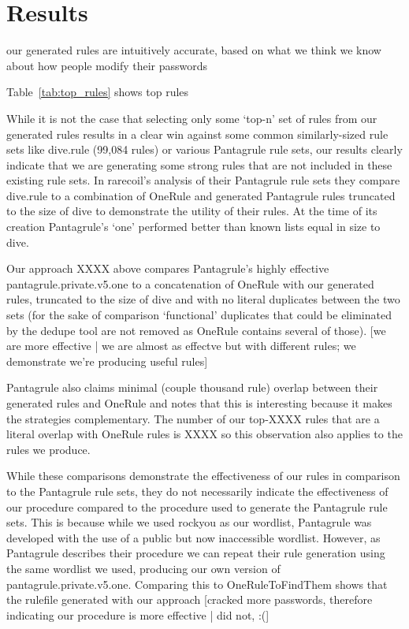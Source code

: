 \documentclass[letterpaper,twocolumn,10pt]{article}
\begin{document}
\section{Results}

our generated rules are intuitively accurate, based on what we think we know
about how people modify their passwords

Table~\ref{tab:top_rules} shows top rules

While it is not the case that selecting only some `top-n' set of rules from our
generated rules results in a clear win against some common similarly-sized rule sets
like dive.rule (99,084 rules) or various Pantagrule rule sets, our results clearly
indicate that we are generating some strong rules that are not included in these
existing rule sets. In rarecoil's analysis of their Pantagrule rule sets they compare
dive.rule to a combination of OneRule and generated Pantagrule rules truncated to
the size of dive to demonstrate the utility of their rules. At the time of its
creation Pantagrule's `one' performed better than known lists equal in size to dive.

Our approach XXXX above compares Pantagrule's highly effective pantagrule.private.v5.one
to a concatenation of OneRule with our generated rules, truncated to the size of dive
and with no literal duplicates between the two sets (for the sake of comparison `functional'
duplicates that could be eliminated by the dedupe tool are not removed as OneRule contains
several of those).  [we are more effective | we are almost as effectve but with different rules;
we demonstrate we're producing useful rules]

Pantagrule also claims minimal (couple thousand rule) overlap between their generated rules and OneRule
and notes that this is interesting because it makes the strategies complementary. The number of our top-XXXX rules
that are a literal overlap with OneRule rules is XXXX so this observation also applies to the rules we produce.

While these comparisons demonstrate the effectiveness of our rules in comparison to the Pantagrule
rule sets, they do not necessarily indicate the effectiveness of our procedure compared to
the procedure used to generate the Pantagrule rule sets. This is because while we used rockyou as
our wordlist, Pantagrule was developed with the use of a public but now inaccessible wordlist.
However, as Pantagrule describes their procedure we can repeat their rule generation using
the same wordlist we used, producing our own version of pantagrule.private.v5.one. Comparing
this to OneRuleToFindThem shows that the rulefile generated with our approach [cracked more passwords,
therefore indicating our procedure is more effective | did not, :(]
\end{document}
